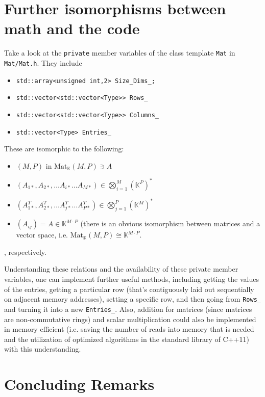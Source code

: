 \documentclass[10pt]{amsart}
\begin{document}
\section{Further isomorphisms between math and the code}

Take a look at the \verb|private| member variables of the class template \verb|Mat| in \verb|Mat/Mat.h|.  They include 
\begin{itemize}
	\item \verb|std::array<unsigned int,2> Size_Dims_;|
	\item \verb|std::vector<std::vector<Type>> Rows_| 
	\item \verb|std::vector<std::vector<Type>> Columns_| 
	\item \verb|std::vector<Type> Entries_| 		
\end{itemize}
These are isomorphic to the following: 
\begin{itemize}
	\item $(M,P)$ in $\text{Mat}_{\mathbb{K}}(M,P) \ni A$
	\item $(A_{1*}, A_{2*}, \dots A_{i*} \dots A_{M*}) \in \bigotimes_{i=1}^M (\mathbb{K}^P)^*$
	\item $(A^T_{1*}, A^T_{2*}, \dots A^T_{j*} \dots A^T_{P*}) \in \bigotimes_{j=1}^P (\mathbb{K}^M)^*$ 
	\item $(A_{ij})=A \in \mathbb{K}^{M\cdot P}$ (there is an obvious isomorphism between matrices and a vector space, i.e. $\text{Mat}_{\mathbb{K}}(M,P) \cong \mathbb{K}^{M\cdot P}$.  		
\end{itemize}, respectively.  

Understanding these relations and the availability of these private member variables, one can implement further useful methods, including getting the values of the entries, getting a particular row (that's contiguously laid out sequentially on adjacent memory addresses), setting a specific row, and then going from \verb|Rows_| and turning it into a new \verb|Entries_|.  Also, addition for matrices (since matrices are non-commutative rings) and scalar multiplication could also be implemented in memory efficient (i.e. saving the number of reads into memory that is needed and the utilization of optimized algorithms in the standard library of C++11) with this understanding.  

\section{Concluding Remarks}
\end{document}
